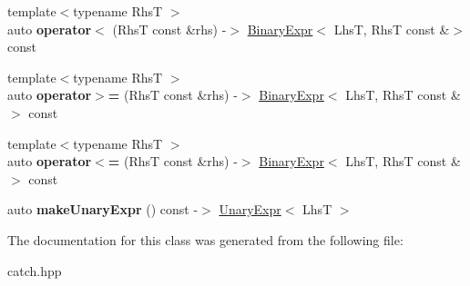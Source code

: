 \begin{DoxyCompactItemize}
\item 
\mbox{\label{classCatch_1_1ExprLhs_a55284221df2edb3542e765c87b5691b9}} 
{\footnotesize template$<$typename RhsT $>$ }\\auto {\bfseries operator$<$} (RhsT const \&rhs) -\/$>$ \hyperlink{classCatch_1_1BinaryExpr}{Binary\+Expr}$<$ LhsT, RhsT const \&$>$ const
\item 
\mbox{\label{classCatch_1_1ExprLhs_aff594ae5b957105c517a6257d2e730f0}} 
{\footnotesize template$<$typename RhsT $>$ }\\auto {\bfseries operator$>$=} (RhsT const \&rhs) -\/$>$ \hyperlink{classCatch_1_1BinaryExpr}{Binary\+Expr}$<$ LhsT, RhsT const \&$>$ const
\item 
\mbox{\label{classCatch_1_1ExprLhs_a6bd8a22c1a7fe2f66d71d7196f20af4f}} 
{\footnotesize template$<$typename RhsT $>$ }\\auto {\bfseries operator$<$=} (RhsT const \&rhs) -\/$>$ \hyperlink{classCatch_1_1BinaryExpr}{Binary\+Expr}$<$ LhsT, RhsT const \&$>$ const
\item 
\mbox{\label{classCatch_1_1ExprLhs_ab68bd6d5d3ae21b7fba9010150fba95d}} 
auto {\bfseries make\+Unary\+Expr} () const -\/$>$ \hyperlink{classCatch_1_1UnaryExpr}{Unary\+Expr}$<$ LhsT $>$
\end{DoxyCompactItemize}


The documentation for this class was generated from the following file\+:\begin{DoxyCompactItemize}
\item 
catch.\+hpp\end{DoxyCompactItemize}
